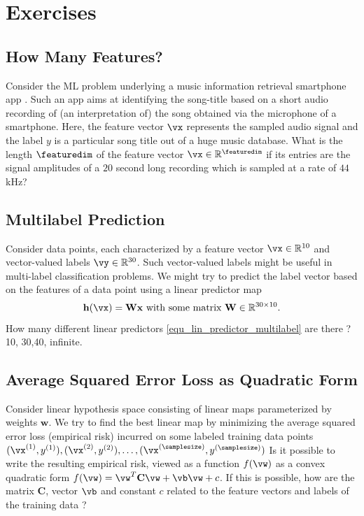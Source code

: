 \documentclass[12pt]{report}
\newcommand{\vh}{\mathbf{h}}
\begin{document}
\newpage
\section{Exercises} 

\subsection{ How Many Features?} 
\label{ex_compML_shazaam}
Consider the ML problem underlying a music information retrieval smartphone 
app \cite{ShazamPaper}. Such an app aims at identifying the song-title based 
on a short audio recording of (an interpretation of) the song obtained via the 
microphone of a smartphone. Here, the feature vector $\vx$ represents the 
sampled audio signal and the label $y$ is a particular song title out of a huge 
music database. What is the length $\featuredim$ of the feature vector 
$\vx \in \mathbb{R}^{\featuredim}$ if its entries are the signal amplitudes of 
a $20$ second long recording which is sampled at a rate of $44$ kHz?


\subsection{Multilabel Prediction} 
\label{ex_ch2_multilabel}
Consider data points, each characterized by a feature vector $\vx \in \mathbb{R}^{10}$ and 
vector-valued labels $\vy \in \mathbb{R}^{30}$. Such vector-valued labels might be useful 
in multi-label classification problems. We might try to predict the label vector based on the 
features of a data point using a linear predictor map 
\begin{equation}
\label{equ_lin_predictor_multilabel}
\vh(\vx) = \mathbf{W} \mathbf{x} \mbox{ with some matrix } \mathbf{W} \in \mathbb{R}^{30 \times 10}. 
\end{equation} 
How many different linear predictors \eqref{equ_lin_predictor_multilabel} are there ? 
10, 30,40, infinite. 




\subsection{Average Squared Error Loss as Quadratic Form} 
\label{ex_2_0}
Consider linear hypothesis space consisting of linear maps parameterized by 
weights $\mathbf{w}$. We try to find the best linear map by minimizing the average 
squared error loss (empirical risk) incurred on some labeled training data points 
$(\vx^{(1)},y^{(1)}),(\vx^{(2)},y^{(2)}),\ldots,(\vx^{(\samplesize)},y^{(\samplesize)})$ 
Is it possible to write the resulting empirical risk, viewed as a function $f(\vw)$ as 
a convex quadratic form $f(\vw) = \vw^{T} \mathbf{C} \vw + \vb \vw + c$. If this 
is possible, how are the matrix $\mathbf{C}$, vector $\vb$ and constant $c$ related 
to the feature vectors and labels of the training data ? 
\end{document}
